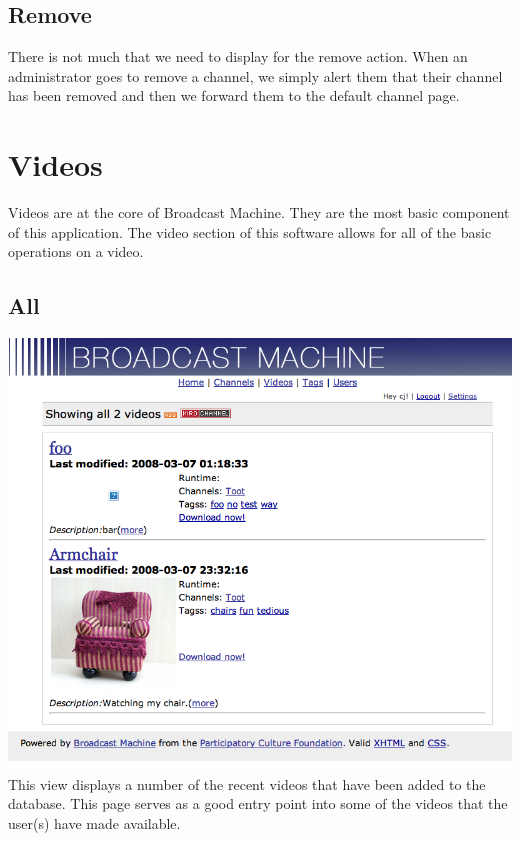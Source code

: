 \documentclass[a4paper,12pt]{report}
\begin{document}
\subsection{Remove}
There is not much that we need to display for the remove action.
When an administrator goes to remove a channel, we simply alert them that their channel has been removed and then we forward them to the default channel page.

\section{Videos}
Videos are at the core of Broadcast Machine.
They are the most basic component of this application.
The video section of this software allows for all of the basic operations on a video.

\subsection{All}
\includegraphics{images/videoall.png}
This view displays a number of the recent videos that have been added to the database.
This page serves as a good entry point into some of the videos that the user(s) have made available.
\end{document}
